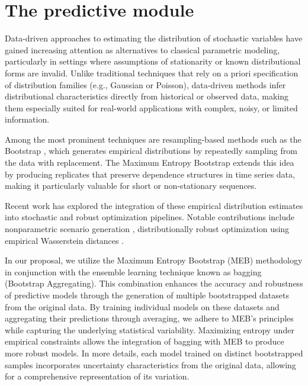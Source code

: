 \documentclass[preprint,11pt,authoryear]{elsarticle}
\begin{document}

\section{The predictive module} \label{Sec:forecasting}

Data-driven approaches to estimating the distribution of stochastic variables have gained increasing attention as alternatives to classical parametric modeling, particularly in settings where assumptions of stationarity or known distributional forms are invalid. Unlike traditional techniques that rely on a priori specification of distribution families (e.g., Gaussian or Poisson), data-driven methods infer distributional characteristics directly from historical or observed data, making them especially suited for real-world applications with complex, noisy, or limited information.

Among the most prominent techniques are resampling-based methods such as the Bootstrap \cite{b1}, which generates empirical distributions by repeatedly sampling from the data with replacement. The Maximum Entropy Bootstrap \cite{Vinod2006} extends this idea by producing replicates that preserve dependence structures in time series data, making it particularly valuable for short or non-stationary sequences.

Recent work has explored the integration of these empirical distribution estimates into stochastic and robust optimization pipelines. Notable contributions include nonparametric scenario generation \cite{BM11}, distributionally robust optimization using empirical Wasserstein distances \cite{EK17}. 

In our proposal, we utilize the Maximum Entropy Bootstrap (MEB) methodology in conjunction with the ensemble learning technique known as bagging (Bootstrap Aggregating). This combination enhances the accuracy and robustness of predictive models through the generation of multiple bootstrapped datasets from the original data. By training individual models on these datasets and aggregating their predictions through averaging, we adhere to MEB's principles while capturing the underlying statistical variability. Maximizing entropy under empirical constraints allows the integration of bagging with MEB to produce more robust models. In more details, each model trained on distinct bootstrapped samples incorporates uncertainty characteristics from the original data, allowing for a comprehensive representation of its variation.
\end{document}
